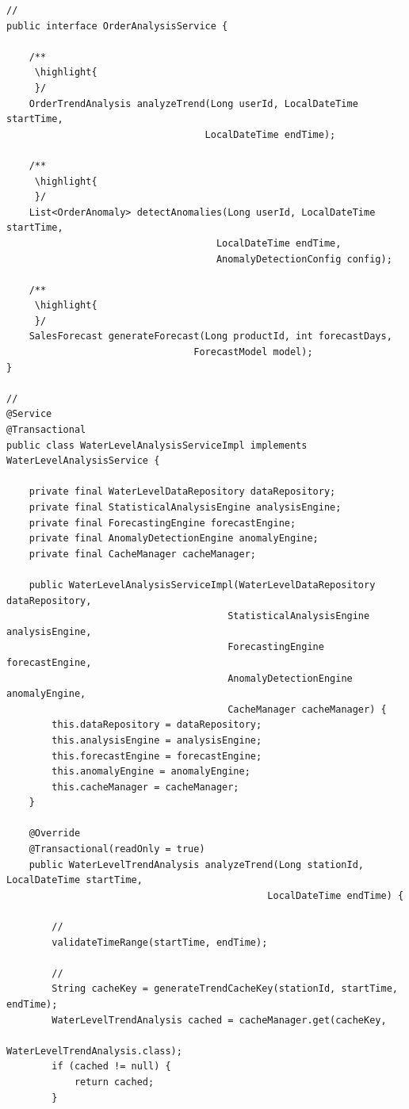 \begin{lstlisting}[style=java]
// 
public interface OrderAnalysisService {
    
    /**
     \highlight{ 
     }/
    OrderTrendAnalysis analyzeTrend(Long userId, LocalDateTime startTime, 
                                   LocalDateTime endTime);
    
    /**
     \highlight{ 
     }/
    List<OrderAnomaly> detectAnomalies(Long userId, LocalDateTime startTime, 
                                     LocalDateTime endTime, 
                                     AnomalyDetectionConfig config);
    
    /**
     \highlight{ 
     }/
    SalesForecast generateForecast(Long productId, int forecastDays,
                                 ForecastModel model);
}

// 
@Service
@Transactional
public class WaterLevelAnalysisServiceImpl implements WaterLevelAnalysisService {
    
    private final WaterLevelDataRepository dataRepository;
    private final StatisticalAnalysisEngine analysisEngine;
    private final ForecastingEngine forecastEngine;
    private final AnomalyDetectionEngine anomalyEngine;
    private final CacheManager cacheManager;
    
    public WaterLevelAnalysisServiceImpl(WaterLevelDataRepository dataRepository,
                                       StatisticalAnalysisEngine analysisEngine,
                                       ForecastingEngine forecastEngine,
                                       AnomalyDetectionEngine anomalyEngine,
                                       CacheManager cacheManager) {
        this.dataRepository = dataRepository;
        this.analysisEngine = analysisEngine;
        this.forecastEngine = forecastEngine;
        this.anomalyEngine = anomalyEngine;
        this.cacheManager = cacheManager;
    }
    
    @Override
    @Transactional(readOnly = true)
    public WaterLevelTrendAnalysis analyzeTrend(Long stationId, LocalDateTime startTime, 
                                              LocalDateTime endTime) {
        
        // 
        validateTimeRange(startTime, endTime);
        
        // 
        String cacheKey = generateTrendCacheKey(stationId, startTime, endTime);
        WaterLevelTrendAnalysis cached = cacheManager.get(cacheKey, 
                                                         WaterLevelTrendAnalysis.class);
        if (cached != null) {
            return cached;
        }
        

\end{lstlisting}
